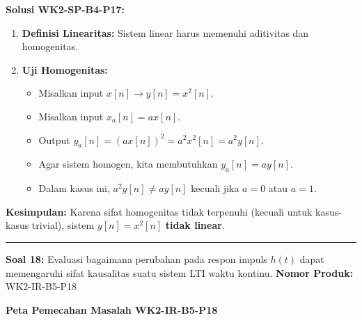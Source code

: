 \documentclass[
  letterpaper,
  DIV=11,
  numbers=noendperiod]{scrreprt}
\providecommand{\tightlist}{%
  \setlength{\itemsep}{0pt}\setlength{\parskip}{0pt}}
\begin{document}
\textbf{Solusi WK2-SP-B4-P17:}

\begin{enumerate}
\def\labelenumi{\arabic{enumi}.}
\tightlist
\item
  \textbf{Definisi Linearitas:} Sistem linear harus memenuhi aditivitas
  dan homogenitas.
\item
  \textbf{Uji Homogenitas:}

  \begin{itemize}
  \tightlist
  \item
    Misalkan input \(x[n] \rightarrow y[n] = x^2[n]\).
  \item
    Misalkan input \(x_a[n] = a x[n]\).
  \item
    Output \(y_a[n] = (a x[n])^2 = a^2 x^2[n] = a^2 y[n]\).
  \item
    Agar sistem homogen, kita membutuhkan \(y_a[n] = a y[n]\).
  \item
    Dalam kasus ini, \(a^2 y[n] \neq a y[n]\) kecuali jika \(a=0\) atau
    \(a=1\).
  \end{itemize}
\end{enumerate}

\textbf{Kesimpulan:} Karena sifat homogenitas tidak terpenuhi (kecuali
untuk kasus-kasus trivial), sistem \(y[n] = x^2[n]\) \textbf{tidak
linear}.

\begin{center}\rule{0.5\linewidth}{0.5pt}\end{center}

\textbf{Soal 18:} Evaluasi bagaimana perubahan pada respon impuls
\(h(t)\) dapat memengaruhi sifat kausalitas suatu sistem LTI waktu
kontinu. \textbf{Nomor Produk:} WK2-IR-B5-P18

\textbf{Peta Pemecahan Masalah WK2-IR-B5-P18}
\end{document}
